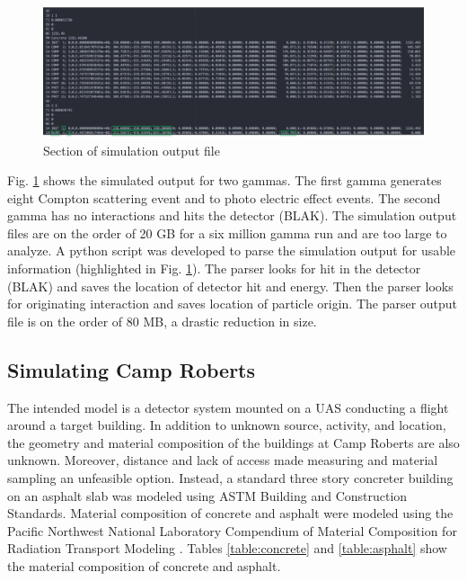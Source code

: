 \begin{figure}[!htb]
  \centering
  \includegraphics[width=\columnwidth]{images/cosima}
  \caption{Section of simulation output file}
  \label{fig:cosima}
\end{figure}

Fig. \ref{fig:cosima} shows the simulated output for two gammas. The first gamma generates eight Compton scattering event and to photo electric effect events. The second gamma has no interactions and hits the detector (BLAK). The simulation output files are on the order of 20 GB for a six million gamma run and are too large to analyze. A python script was developed to parse the simulation output for usable information (highlighted in Fig. \ref{fig:cosima}). The parser looks for hit in the detector (BLAK) and saves the location of detector hit and energy. Then the parser looks for originating interaction and saves location of particle origin. The parser output file is on the order of 80 MB, a drastic reduction in size.

\subsection{Simulating Camp Roberts}
\noindent The intended model is a detector system mounted on a UAS conducting a flight around a target building. In addition to unknown source, activity, and location, the geometry and material composition of the buildings at Camp Roberts are also unknown. Moreover, distance and lack of access made measuring and material sampling an unfeasible option. Instead, a standard three story concreter building on an asphalt slab was modeled using ASTM Building and Construction Standards. Material composition of concrete and asphalt were modeled using the Pacific Northwest National Laboratory Compendium of Material Composition for Radiation Transport Modeling \cite{compendium}. Tables \ref{table:concrete} and \ref{table:asphalt} show the material composition of concrete and asphalt.

